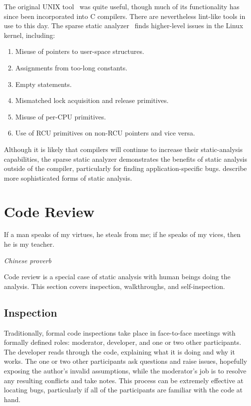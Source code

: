 The original UNIX  tool~\cite{StephenJohnson1977lint} was
quite useful, though much of its functionality has since been incorporated
into C compilers.
There are nevertheless lint-like tools in use to this day.
The sparse static analyzer~\cite{JonathanCorbet2004sparse}
finds higher-level issues in the Linux kernel, including:

\begin{enumerate}
\item	Misuse of pointers to user-space structures.
\item	Assignments from too-long constants.
\item	Empty  statements.
\item	Mismatched lock acquisition and release primitives.
\item	Misuse of per-CPU primitives.
\item	Use of RCU primitives on non-RCU pointers and vice versa.
\end{enumerate}

Although it is likely that compilers will continue to increase their
static-analysis capabilities, the sparse static analyzer demonstrates
the benefits of static analysis outside of the compiler, particularly
for finding application-specific bugs.
describe more sophisticated forms of static analysis.

\section{Code Review}
\label{sec:debugging:Code Review}
%
\epigraph{If a man speaks of my virtues, he steals from me;
	  if he speaks of my vices, then he is my teacher.}
	 {\emph{Chinese proverb}}

Code review is a special case of static analysis with human beings doing
the analysis.
This section covers inspection, walkthroughs, and self-inspection.

\subsection{Inspection}
\label{sec:debugging:Inspection}

Traditionally, formal code inspections take place in face-to-face meetings
with formally defined roles: moderator, developer, and one or two other
participants.
The developer reads through the code, explaining what it is doing and
why it works.
The one or two other participants ask questions and raise issues,
hopefully exposing the author's invalid assumptions, while the moderator's
job is to resolve any resulting conflicts and take notes.
This process can be extremely effective at locating bugs, particularly
if all of the participants are familiar with the code at hand.

